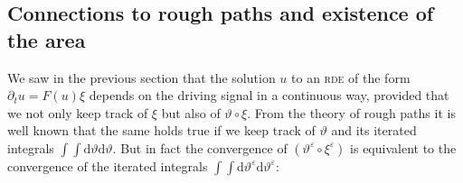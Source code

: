 \documentclass[a4paper,11pt]{article}
\newcommand{\mathD}{\mathrm{D}}
\newcommand{\mathd}{\mathrm{d}}
\theoremstyle{remark}
\newcommand{\reso}{\,\mathord{\circ}\,}
\begin{document}




\subsection{Connections to rough paths and existence of the area}

We saw in the previous section that the solution $u$ to an \textsc{rde} of the form
$\partial_{t} u=F ( u ) \xi$ depends on the driving signal in a continuous way, provided
that we not only keep track of $\xi$ but also of $\vartheta \reso \xi$. From
the theory of rough paths it is well known that the same holds true if we keep
track of $\vartheta$ and its iterated integrals $\int \int \mathd \vartheta \mathd \vartheta$. But in fact the convergence of $( \vartheta^{\varepsilon} \reso \xi^{\varepsilon} )$
is equivalent to the convergence of the iterated integrals $\int \int \mathd \vartheta^{\varepsilon} \mathd \vartheta^{\varepsilon}$:
\end{document}
